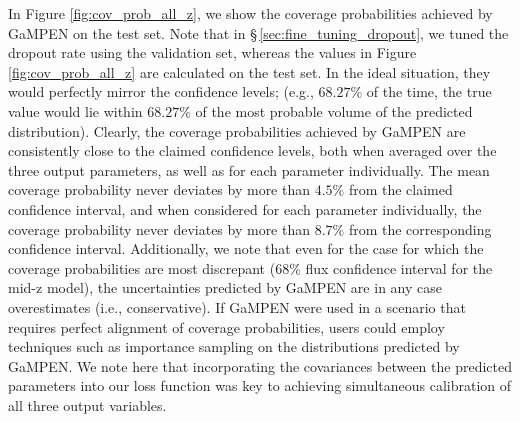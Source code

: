\documentclass[linenumbers,twocolumn,twocolappendix]{aastex631}
\newcommand\gampen{GaMPEN}
\begin{document}
\begin{CJK*}{UTF8}{gbsn}
In Figure \ref{fig:cov_prob_all_z}, we show the coverage probabilities achieved by \gampen{} on the test set. Note that in \S\,\ref{sec:fine_tuning_dropout}, we tuned the dropout rate using the validation set, whereas the values in Figure \ref{fig:cov_prob_all_z} are calculated on the test set. In the ideal situation, they would perfectly mirror the confidence levels; (e.g., $68.27\%$ of the time, the true value would lie within $68.27\%$ of the most probable volume of the predicted distribution). Clearly, the coverage probabilities achieved by \gampen{} are consistently close to the claimed confidence levels, both when averaged over the three output parameters, as well as for each parameter individually. The mean coverage probability never deviates by more than $4.5\%$ from the claimed confidence interval, and when considered for each parameter individually, the coverage probability never deviates by more than $8.7\%$ from the corresponding confidence interval. Additionally, we note that even for the case for which the coverage probabilities are most discrepant ($68\%$ flux confidence interval for the mid-z model), the uncertainties predicted by \gampen{} are in any case overestimates (i.e., conservative). If \gampen{} were used in a scenario that requires perfect alignment of coverage probabilities, users could employ techniques such as importance sampling \citep{importance_sampling} on the distributions predicted by \gampen{}. We note here that incorporating the covariances between the predicted parameters into our loss function was key to achieving simultaneous calibration of all three output variables. 


\end{CJK*}
\end{document}
